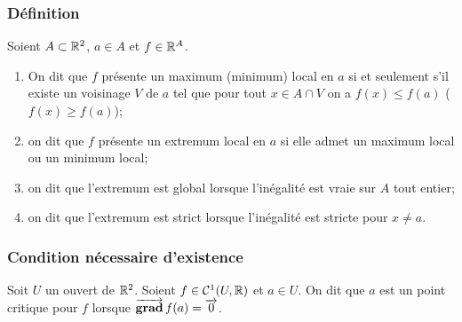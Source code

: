 \subsubsection{Définition}

\begin{defdef}
  Soient \(A \subset \mathbb{R}^2\), \(a \in A\) et \(f \in \mathbb{R}^A\).
  \begin{enumerate}
    \item On dit que \(f\) présente un maximum (minimum) local en \(a\) si et seulement s'il existe un voisinage \(V\) de \(a\) tel que pour tout \(x \in A \cap V\) on a \(f(x) \leqslant f(a)\) (\(f(x) \geqslant f(a)\));
    \item on dit que \(f\) présente un extremum local en \(a\) si elle admet un maximum local ou un minimum local;
    \item on dit que l'extremum est global lorsque l'inégalité est vraie sur \(A\) tout entier;
    \item on dit que l'extremum est strict lorsque l'inégalité est stricte pour \(x \neq a\).
  \end{enumerate}
\end{defdef}

\subsubsection{Condition nécessaire d'existence}

\begin{defdef}
  Soit \(U\) un ouvert de \(\mathbb{R}^2\). Soient \(f \in \mathcal{C}^{1}(U, \mathbb{R})\) et \(a \in U\). On dit que \(a\) est un point critique pour \(f\) lorsque \(\operatorname{\overrightarrow{\mathbf{grad}}} f(a)=\overrightarrow{0}\).
\end{defdef}


